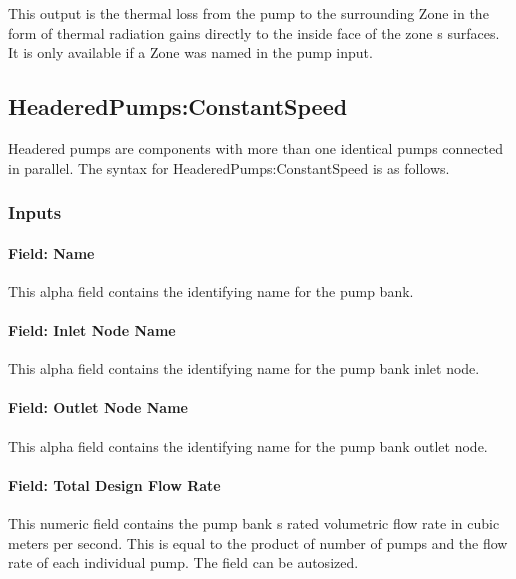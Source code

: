 This output is the thermal loss from the pump to the surrounding Zone in the form of thermal radiation gains directly to the inside face of the zone s surfaces. It is only available if a Zone was named in the pump input.

\subsection{HeaderedPumps:ConstantSpeed}\label{headeredpumpsconstantspeed}

Headered pumps are components with more than one identical pumps connected in parallel. The syntax for HeaderedPumps:ConstantSpeed is as follows.

\subsubsection{Inputs}\label{inputs-3-027}

\paragraph{Field: Name}\label{field-name-3-024}

This alpha field contains the identifying name for the pump bank.

\paragraph{Field: Inlet Node Name}\label{field-inlet-node-name-3-000}

This alpha field contains the identifying name for the pump bank inlet node.

\paragraph{Field: Outlet Node Name}\label{field-outlet-node-name-3-000}

This alpha field contains the identifying name for the pump bank outlet node.

\paragraph{Field: Total Design Flow Rate}\label{field-total-design-flow-rate}

This numeric field contains the pump bank s rated volumetric flow rate in cubic meters per second. This is equal to the product of number of pumps and the flow rate of each individual pump. The field can be autosized.

